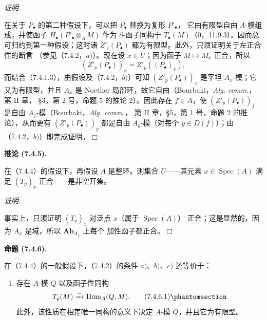 \documentclass[UTF8,fontset=none,11pt,oneside,openany]{ctexbook}
\providecommand{\square}{\mdlgwhtsquare}
\newenvironment{proposition}[1][]{%
  \par\medskip\noindent\textbf{命题 (#1).}\ %
}{\par}
\newenvironment{corollary}[1][]{%
  \par\medskip\noindent\textbf{推论 (#1).}\ %
}{\par}
\newenvironment{proof}{%
  \par\smallskip\noindent\textit{证明.}\ %
}{\hfill$\square$\par}
\newcommand{\oldpage}[2][]{%
  \hypertarget{ega-source-page-#1-#2}{}%
  \marginnote{\scriptsize\textbf{#1}~|~#2}\ignorespaces}
\let\EGAOriginalLabel\label
\renewcommand{\label}[1]{\phantomsection\EGAOriginalLabel{#1}}
\begin{document}
\begin{proof}
在关于 $P_\bullet$ 的第二种假设下，可以把 $P_\bullet$ 替换为复形
$P'_\bullet$，
\oldpage[III]{188}
它由有限型自由 $A$-模组成，并使函子
$H_\bullet(P'_\bullet\otimes_A M)$ 作为 $\partial$-函子同构于
$T_\bullet(M)$（0，11.9.3）。因而总可归约到第一种假设；这时诸
$Z'_i(P_\bullet)$ 都为有限型。此外，只须证明关于左正合性的断言
（参见（7.4.2，$a)$）。现在设 $x\in U$；因为函子 $M\mapsto M_x$
正合，所以
\[
  (Z'_p(P_\bullet))_x=Z'_p((P_\bullet)_x),
\]
而结合（7.4.1.3），由假设及（7.4.2，$b)$）可知
$(Z'_p(P_\bullet))_x$ 是平坦 $A_x$-模；它又为有限型，并且 $A_x$
是 Noether 局部环，故它自由（Bourbaki，\emph{Alg. comm.}，第 II 章，
\S 3，第 2 号，命题 5 的推论 2）。因此存在 $f\in A$，使
$(Z'_p(P_\bullet))_f$ 是自由 $A_f$-模（Bourbaki，\emph{Alg. comm.}，
第 II 章，\S 5，第 1 号，命题 2 的推论），从而更有
$(Z'_p(P_\bullet))_y$ 都是自由 $A_y$-模（对每个 $y\in D(f)$）；由
（7.4.2，$b)$）即完成证明。
\end{proof}

\begin{corollary}[7.4.5]
在（7.4.4）的假设下，再假设 $A$ 是整环。则集合 $U$——其元素
$x\in\operatorname{Spec}(A)$ 满足 $(T_p)_x$ 正合——是非空开集。
\end{corollary}

\begin{proof}
事实上，只须证明 $(T_p)_x$ 对泛点 $x$（属于 $\operatorname{Spec}(A)$）
正合；这是显然的，因为 $A_x$ 是域，所以 $\mathbf{Ab}_{A_x}$ 上每个
加性函子都正合。
\end{proof}

\begin{proposition}[7.4.6]
在（7.4.4）的一般假设下，（7.4.2）的条件 $a)$、$b)$、$c)$ 还等价于：
\begin{enumerate}
  \item[d)] 存在 $A$-模 $Q$ 以及函子性同构
    \[
      T_p(M)\xrightarrow{\sim}\operatorname{Hom}_A(Q,M).
      \tag{7.4.6.1}\label{III.7.4.6.1.fr}
    \]
    此外，该性质在相差唯一同构的意义下决定 $A$-模 $Q$，并且它为有限型。
\end{enumerate}
\end{proposition}
\end{document}
